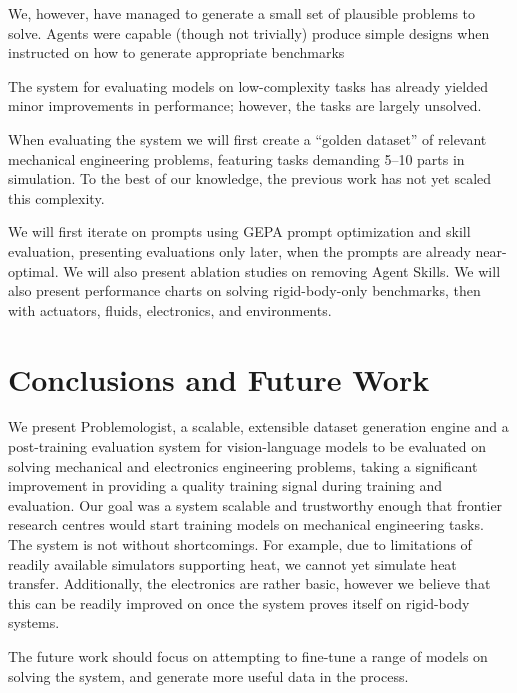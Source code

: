 \documentclass[conference]{IEEEtran}
\begin{document}
We, however, have managed to generate a small set of plausible problems to solve. Agents were capable (though not trivially) produce simple designs when instructed on how to generate appropriate benchmarks

The system for evaluating models on low-complexity tasks has already yielded minor improvements in performance; however, the tasks are largely unsolved.

When evaluating the system we will first create a ``golden dataset'' of relevant mechanical engineering problems, featuring tasks demanding 5--10 parts in simulation. To the best of our knowledge, the previous work has not yet scaled this complexity.

We will first iterate on prompts using GEPA prompt optimization and skill evaluation, presenting evaluations only later, when the prompts are already near-optimal. We will also present ablation studies on removing Agent Skills. We will also present performance charts on solving rigid-body-only benchmarks, then with actuators, fluids, electronics, and environments.

\section{Conclusions and Future Work}
We present Problemologist, a scalable, extensible dataset generation engine and a post-training evaluation system for vision-language models to be evaluated on solving mechanical and electronics engineering problems, taking a significant improvement in providing a quality training signal during training and evaluation. Our goal was a system scalable and trustworthy enough that frontier research centres would start training models on mechanical engineering tasks. The system is not without shortcomings. For example, due to limitations of readily available simulators supporting heat, we cannot yet simulate heat transfer. Additionally, the electronics are rather basic, however we believe that this can be readily improved on once the system proves itself on rigid-body systems.

The future work should focus on attempting to fine-tune a range of models on solving the system, and generate more useful data in the process.
\end{document}
